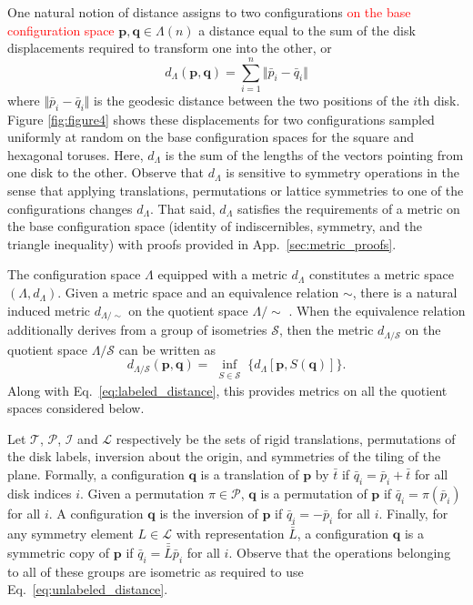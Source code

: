 \documentclass[default,iicol]{sn-jnl}%
\theoremstyle{thmstyleone}%
\theoremstyle{thmstyletwo}%
\theoremstyle{thmstylethree}%
\renewcommand{\vec}[1]{\bar{#1}}
\providecommand{\mat}[1]{\bar{\bar{#1}}}
\providecommand{\config}[1]{\mathbf{#1}}
\providecommand{\red}[1]{\textcolor{red}{#1}}
\begin{document}
One natural notion of distance assigns to two configurations \red{on the base configuration space} $\config{p}, \config{q} \in \Lambda(n)$ a distance equal to the sum of the disk displacements required to transform one into the other, or
\begin{equation}
d_\Lambda(\config{p},\config{q}) = \sum_{i=1}^{n} {\Vert \vec{p}_i - \vec{q}_i \Vert}
\label{eq:labeled_distance}
\end{equation}
where $\Vert \vec{p}_i - \vec{q}_i \Vert$ is the geodesic distance between the two positions of the $i$th disk. Figure \ref{fig:figure4} shows these displacements for two configurations sampled uniformly at random on the base configuration spaces for the square and hexagonal toruses. Here, $d_\Lambda$ is the sum of the lengths of the vectors pointing from one disk to the other. Observe that $d_\Lambda$ is sensitive to symmetry operations in the sense that applying translations, permutations or lattice symmetries to one of the configurations changes $d_\Lambda$. That said, $d_\Lambda$ satisfies the requirements of a metric on the base configuration space (identity of indiscernibles, symmetry, and the triangle inequality) with proofs provided in App.\ \ref{sec:metric_proofs}.

The configuration space $\Lambda$ equipped with a metric $d_\Lambda$ constitutes a metric space $(\Lambda,d_\Lambda)$. Given a metric space and an equivalence relation $\sim$, there is a natural induced metric $d_{\Lambda / \sim}$ on the quotient space ${\Lambda/\!\!\sim}$ \cite{burago2001course}. When the equivalence relation additionally derives from a group of isometries $\mathcal{S}$, then the metric $d_{\Lambda / \mathcal{S}}$ on the quotient space $\Lambda / \mathcal{S}$ can be written as
\begin{equation}
d_{\Lambda / \mathcal{S}}(\config{p}, \config{q}) = \inf\limits_{\substack{S \in \mathcal{S}}} \{ d_\Lambda[\config{p}, S(\config{q})] \}.
\label{eq:unlabeled_distance}
\end{equation}
Along with Eq.\ \ref{eq:labeled_distance}, this provides metrics on all the quotient spaces considered below.

Let $\mathcal{T}$, $\mathcal{P}$, $\mathcal{I}$ and $\mathcal{L}$ respectively be the sets of rigid translations, permutations of the disk labels, inversion about the origin, and symmetries of the tiling of the plane. Formally, a configuration $\config{q}$ is a translation of $\config{p}$ by $\vec{t}$ if $\vec{q}_i = \vec{p}_i + \vec{t}$ for all disk indices $i$. Given a permutation $\pi \in \mathcal{P}$, $\config{q}$ is a permutation of $\config{p}$ if $\vec{q}_i = \pi(\vec{p}_i)$ for all $i$. A configuration $\config{q}$ is the inversion of $\config{p}$ if $\vec{q}_i = -\vec{p}_i$ for all $i$. Finally, for any symmetry element $L \in \mathcal{L}$ with representation $\mat{L}$, a configuration $\config{q}$ is a symmetric copy of $\config{p}$ if $\vec{q}_i = \mat{L} \vec{p}_i$ for all $i$. Observe that the operations belonging to all of these groups are isometric as required to use Eq.\ \ref{eq:unlabeled_distance}. 
\end{document}
